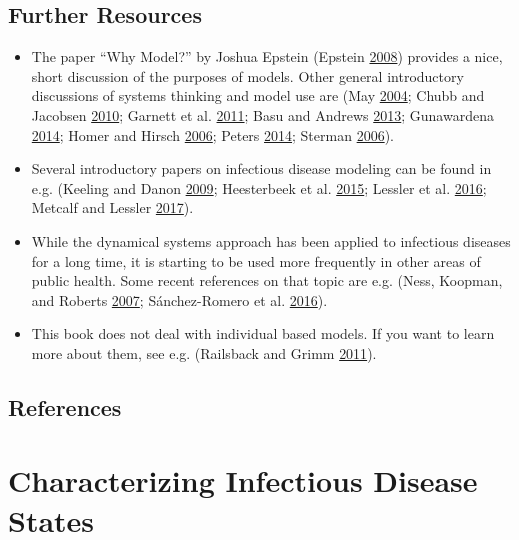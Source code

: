 \documentclass[]{book}
\providecommand{\tightlist}{%
  \setlength{\itemsep}{0pt}\setlength{\parskip}{0pt}}
\theoremstyle{definition}
\theoremstyle{definition}
\theoremstyle{definition}
\theoremstyle{remark}
\begin{document}
\section{Further Resources}\label{further-resources}

\begin{itemize}
\tightlist
\item
  The paper ``Why Model?'' by Joshua Epstein (Epstein
  \protect\hyperlink{ref-epstein08}{2008}) provides a nice, short
  discussion of the purposes of models. Other general introductory
  discussions of systems thinking and model use are (May
  \protect\hyperlink{ref-may04}{2004}; Chubb and Jacobsen
  \protect\hyperlink{ref-chubb10}{2010}; Garnett et al.
  \protect\hyperlink{ref-garnett11}{2011}; Basu and Andrews
  \protect\hyperlink{ref-basu13}{2013}; Gunawardena
  \protect\hyperlink{ref-gunawardena14}{2014}; Homer and Hirsch
  \protect\hyperlink{ref-homer06}{2006}; Peters
  \protect\hyperlink{ref-peters14}{2014}; Sterman
  \protect\hyperlink{ref-sterman06}{2006}).
\item
  Several introductory papers on infectious disease modeling can be
  found in e.g. (Keeling and Danon
  \protect\hyperlink{ref-keeling09}{2009}; Heesterbeek et al.
  \protect\hyperlink{ref-heesterbeek15}{2015}; Lessler et al.
  \protect\hyperlink{ref-lessler16}{2016}; Metcalf and Lessler
  \protect\hyperlink{ref-metcalf17}{2017}).
\item
  While the dynamical systems approach has been applied to infectious
  diseases for a long time, it is starting to be used more frequently in
  other areas of public health. Some recent references on that topic are
  e.g. (Ness, Koopman, and Roberts \protect\hyperlink{ref-ness07}{2007};
  Sánchez-Romero et al. \protect\hyperlink{ref-sanchez-romero16}{2016}).
\item
  This book does not deal with individual based models. If you want to
  learn more about them, see e.g. (Railsback and Grimm
  \protect\hyperlink{ref-railsback11}{2011}).
\end{itemize}

\section{References}\label{references-1}

\chapter{Characterizing Infectious Disease States}\label{idstates}
\end{document}
